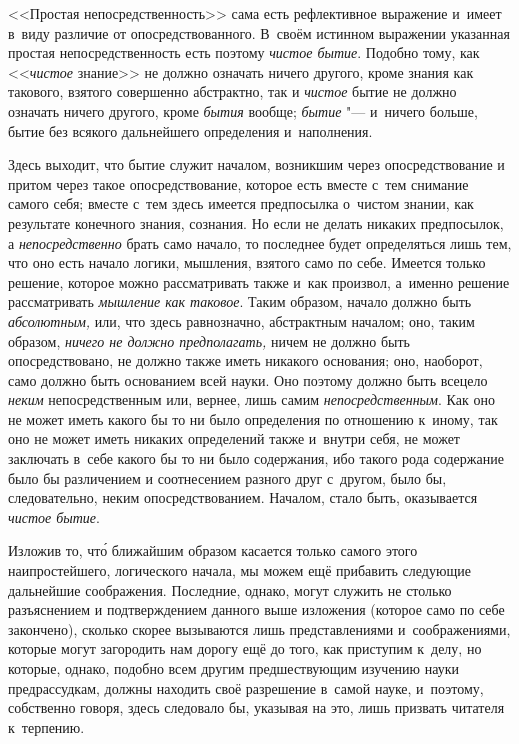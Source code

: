 <<Простая непосредственность>> сама есть рефлективное выражение и~имеет в~виду
различие от опосредствованного. В~своём истинном выражении указанная простая
непосредственность есть поэтому {\em чистое бытие}. Подобно тому, как
<<{\em чистое} знание>> не должно означать ничего другого, кроме знания как
такового, взятого совершенно абстрактно, так и {\em чистое} бытие не должно
означать ничего другого, кроме {\em бытия} вообще; {\em бытие} "--- и~ничего
больше, бытие без всякого дальнейшего определения и~наполнения.

Здесь выходит, что бытие служит началом, возникшим через опосредствование и
притом через такое опосредствование, которое есть вместе с~тем снимание
самого себя; вместе с~тем здесь имеется предпосылка о~чистом знании, как
результате конечного знания, сознания. Но если не делать никаких
предпосылок, а {\em непосредственно} брать само начало,
то последнее будет определяться лишь тем, что оно есть начало логики,
мышления, взятого само по себе. Имеется только решение, которое можно
рассматривать также и~как произвол, а~именно решение рассматривать
{\em мышление как таковое}. Таким образом, начало должно
быть {\em абсолютным,} или, что здесь равнозначно,
абстрактным началом; оно, таким образом, {\em ничего не должно предполагать,}
ничем не должно быть опосредствовано, не должно также
иметь никакого основания; оно, наоборот, само должно быть основанием всей
науки. Оно поэтому должно быть всецело {\em неким} непосредственным или,
вернее, лишь самим {\em непосредственным}. Как оно не может иметь какого
бы то ни было определения по отношению к~иному, так оно не может иметь
никаких определений также и~внутри себя, не может заключать в~себе какого
бы то ни было содержания, ибо такого рода содержание было бы различением и
соотнесением разного друг с~другом, было бы, следовательно, неким
опосредствованием. Началом, стало быть, оказывается {\em чистое бытие}.

Изложив то, чт\'{о} ближайшим образом касается только самого этого
наипростейшего, логического начала, мы можем ещё прибавить следующие дальнейшие
соображения. Последние, однако, могут служить не столько разъяснением и
подтверждением данного выше изложения (которое само по себе закончено), сколько
скорее вызываются лишь представлениями и~соображениями, которые могут
загородить нам дорогу ещё до того, как приступим к~делу, но которые, однако,
подобно всем другим предшествующим изучению науки предрассудкам, должны
находить своё разрешение в~самой науке, и~поэтому, собственно говоря, здесь
следовало бы, указывая на это, лишь призвать читателя к~терпению.

